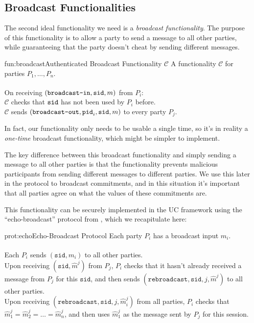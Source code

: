 \subsection{Broadcast Functionalities}

The second ideal functionality we need is a \emph{broadcast functionality}.
The purpose of this functionality is to allow a party to send a message
to all other parties, while guaranteeing that the party doesn't cheat
by sending different messages.

\begin{afunctionality}{fun:broadcast}{Authenticated Broadcast Functionality $\mathcal{C}$}
A functionality $\mathcal{C}$ for parties $P_1, \ldots, P_n$.\\
\\
On receiving $(\texttt{broadcast-in}, \texttt{sid}, m)$ from $P_i$:\\
$\mathcal{C}$ checks that $\texttt{sid}$ has not been used by $P_i$ before.\\
$\mathcal{C}$ sends $(\texttt{broadcast-out}, \texttt{pid}_i, \texttt{sid}, m)$ to every party $P_j$.
\end{afunctionality}

In fact, our functionality only needs to be usable a single time, so it's
in reality a \emph{one-time} broadcast functionality, which might be simpler
to implement.

The key difference between this broadcast functionality and simply sending
a message to all other parties is that the functionality prevents malicious
participants from sending different messages to different parties.
We use this later in the protocol to broadcast commitments, and in this
situation it's important that all parties agree on what the values of
these commitments are.

This functionality can be securely implemented
in the UC framework using the ``echo-broadcast'' protocol from
\cite{goldwasser_secure_2005}, which we recapitulate here:

\begin{aprotocol}{prot:echo}{Echo-Broadcast Protocol}
Each party $P_i$ has a broadcast input $m_i$.\\
\\
Each $P_i$ sends $(\texttt{sid}, m_i)$ to all other parties.\\
Upon receiving $(\texttt{sid}, \hat{m}^j)$ from $P_j$, $P_i$ checks that
it hasn't already received a message from $P_j$ for this $\texttt{sid}$,
and then sends $(\texttt{rebroadcast}, \texttt{sid}, j, \hat{m}^j)$ to all other parties.\\
Upon receiving $(\texttt{rebroadcast}, \texttt{sid}, j, \hat{m}_i^j)$ from all
parties, $P_i$ checks that $\hat{m}_1^j = \hat{m}_2^j = \ldots = \hat{m}^j_n$,
and then uses $\hat{m}^j_1$ as the message sent by $P_j$ for this session.
\end{aprotocol}

